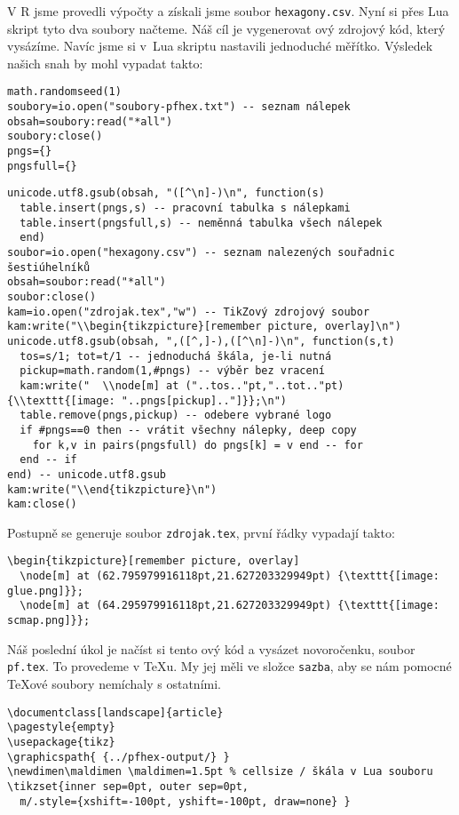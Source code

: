V R jsme provedli výpočty a získali jsme soubor \texttt{hexagony.csv}. Nyní si přes Lua skript tyto dva soubory načteme. Náš cíl je vygenerovat \TikZ ový zdrojový kód, který vysázíme. Navíc jsme si v~Lua skriptu nastavili jednoduché měřítko. Výsledek našich snah by mohl vypadat takto:
\begin{lstlisting}
math.randomseed(1)
soubory=io.open("soubory-pfhex.txt") -- seznam nálepek
obsah=soubory:read("*all")
soubory:close()
pngs={}
pngsfull={}
\end{lstlisting}

\begin{lstlisting}
unicode.utf8.gsub(obsah, "([^\n]-)\n", function(s)
  table.insert(pngs,s) -- pracovní tabulka s nálepkami
  table.insert(pngsfull,s) -- neměnná tabulka všech nálepek
  end)
soubor=io.open("hexagony.csv") -- seznam nalezených souřadnic šestiúhelníků
obsah=soubor:read("*all")
soubor:close()
kam=io.open("zdrojak.tex","w") -- TikZový zdrojový soubor
kam:write("\\begin{tikzpicture}[remember picture, overlay]\n")
unicode.utf8.gsub(obsah, ",([^,]-),([^\n]-)\n", function(s,t)
  tos=s/1; tot=t/1 -- jednoduchá škála, je-li nutná
  pickup=math.random(1,#pngs) -- výběr bez vracení
  kam:write("  \\node[m] at ("..tos.."pt,"..tot.."pt) {\\texttt{[image: "..pngs[pickup].."]}};\n")
  table.remove(pngs,pickup) -- odebere vybrané logo
  if #pngs==0 then -- vrátit všechny nálepky, deep copy
    for k,v in pairs(pngsfull) do pngs[k] = v end -- for
  end -- if
end) -- unicode.utf8.gsub
kam:write("\\end{tikzpicture}\n")
kam:close()
\end{lstlisting}

Postupně se generuje soubor \texttt{zdrojak.tex}, první řádky vypadají takto:
\begin{lstlisting}
\begin{tikzpicture}[remember picture, overlay]
  \node[m] at (62.795979916118pt,21.627203329949pt) {\texttt{[image: glue.png]}};
  \node[m] at (64.295979916118pt,21.627203329949pt) {\texttt{[image: scmap.png]}};
\end{lstlisting}	

Náš poslední úkol je načíst si tento \TikZ ový kód a vysázet novoročenku, soubor \texttt{pf.tex}. To provedeme v \TeX u. My jej měli ve složce \texttt{sazba}, aby se nám pomocné \TeX ové soubory nemíchaly s ostatními. 
\begin{lstlisting}
\documentclass[landscape]{article}
\pagestyle{empty}
\usepackage{tikz}
\graphicspath{ {../pfhex-output/} }
\newdimen\maldimen \maldimen=1.5pt % cellsize / škála v Lua souboru
\tikzset{inner sep=0pt, outer sep=0pt, 
  m/.style={xshift=-100pt, yshift=-100pt, draw=none} }
\end{lstlisting}

